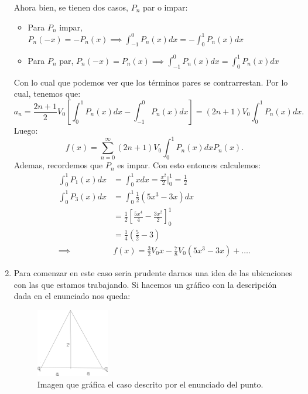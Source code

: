 \begin{enumerate}
      Ahora bien, se tienen dos casos, $P_n$ par o impar:
      \begin{itemize}
        \item Para $P_n$ impar, $P_n\left( -x \right) = - P_n\left( x \right) \implies \int_{-1}^{0} P_n\left( x \right) dx = - \int_0^{1}P_n\left( x \right) dx$
	\item Para $P_n$ par, $P_n\left( -x \right) = P_n\left( x \right) \implies \int_{-1}^{0}P_n\left( x \right) dx = \int_0^{1} P_n\left( x \right) dx$
      \end{itemize}
      Con lo cual que podemos ver que los términos pares se contrarrestan. Por lo cual, tenemos que: \[
	a_n = \frac{2n + 1}{2}V_0 \left[ \int_0^{1}P_n\left( x \right) dx - \int_{-1}^{0}P_n\left( x \right) dx \right] = \left( 2n + 1 \right) V_0 \int_0^{1}P_n\left( x \right) dx
      .\] Luego: \[
      f\left( x \right)  = \sum_{n=0}^{\infty} \left( 2n + 1 \right) V_0 \int_{0}^{1}P_n\left( x \right) dx P_n\left( x \right) 
      .\] Ademas, recordemos que $P_n$ es impar. Con esto entonces calculemos:
      \begin{align*}
	\int_{0}^{1} P_1 \left( x \right) dx &= \int_{0}^{1}x dx = \frac{x^2}{2} |_{0}^{1} = \frac{1}{2}\\
	\int_{0}^{1}P_3\left( x \right) dx &= \int_{0}^{1}\frac{1}{2}\left( 5x^{3}- 3x \right) dx\\
	&=  \frac{1}{2}\left[ \frac{5x^{4}}{4} - \frac{3x^2}{2} \right]_0^{1}\\
	&= \frac{1}{4}\left( \frac{5}{2} - 3 \right)  \\
	\implies& f\left( x \right) = \frac{3}{2}V_0 x - \frac{7}{8}V_0\left( 5x^{3}- 3x \right) + \ldots
      .\end{align*}
    \item Para comenzar en este caso seria prudente darnos una idea de las ubicaciones con las que estamos trabajando. Si hacemos un gráfico con la descripción dada en el enunciado nos queda:
      \begin{figure}[h]
        \centering
        \includegraphics[width=0.3\textwidth]{Imagenes/punto_2.png}
        \caption{Imagen que gráfica el caso descrito por el enunciado del punto.}
        \label{fig:punto_2}
      \end{figure}


\end{enumerate}
